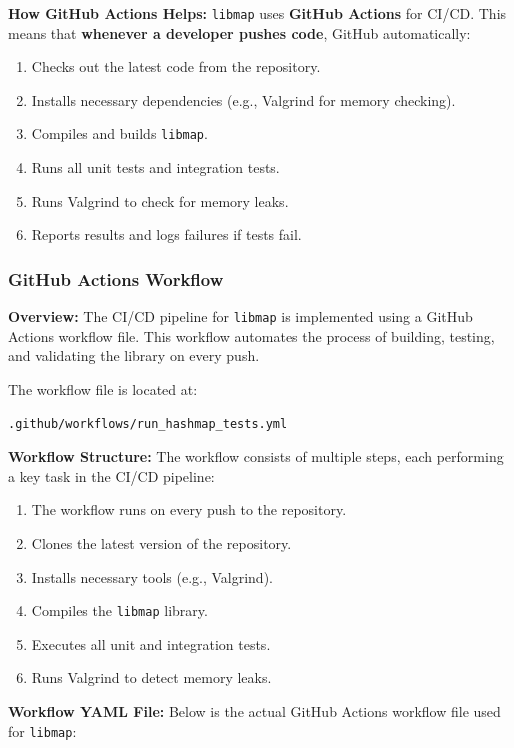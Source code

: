 \documentclass[titlepage]{article}
\begin{document}
\textbf{How GitHub Actions Helps:}  
\texttt{libmap} uses \textbf{GitHub Actions} for CI/CD. This means that \textbf{whenever a developer pushes code}, GitHub automatically:  
\begin{enumerate}  
    \item Checks out the latest code from the repository.  
    \item Installs necessary dependencies (e.g., Valgrind for memory checking).  
    \item Compiles and builds \texttt{libmap}.  
    \item Runs all unit tests and integration tests.  
    \item Runs Valgrind to check for memory leaks.  
    \item Reports results and logs failures if tests fail.  
\end{enumerate}  


\subsubsection{GitHub Actions Workflow}

\textbf{Overview:}  
The CI/CD pipeline for \texttt{libmap} is implemented using a GitHub Actions workflow file. This workflow automates the process of building, testing, and validating the library on every push.  

The workflow file is located at:  
\begin{verbatim}
.github/workflows/run_hashmap_tests.yml
\end{verbatim}

\textbf{Workflow Structure:}  
The workflow consists of multiple steps, each performing a key task in the CI/CD pipeline:  

\begin{enumerate}
    \item  The workflow runs on every push to the repository.
    \item  Clones the latest version of the repository.
    \item  Installs necessary tools (e.g., Valgrind).
    \item  Compiles the \texttt{libmap} library.
    \item  Executes all unit and integration tests.
    \item  Runs Valgrind to detect memory leaks.
\end{enumerate}

\textbf{Workflow YAML File:}  
Below is the actual GitHub Actions workflow file used for \texttt{libmap}:  
\end{document}
